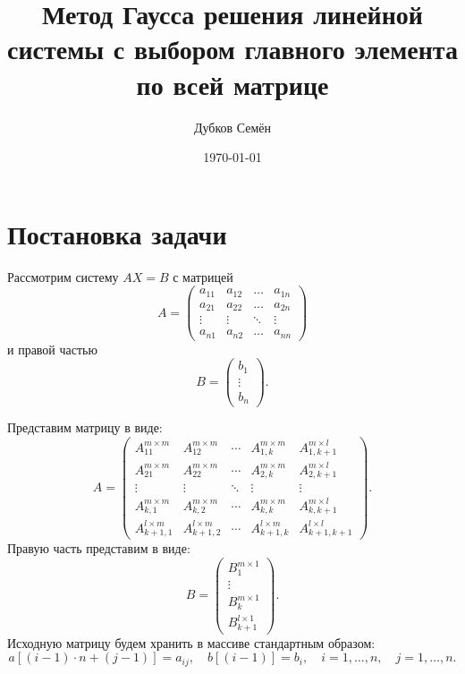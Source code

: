 \documentclass[a4paper,12pt]{article}
\begin{document}
\author{Дубков Семён}
\title{Метод Гаусса решения линейной системы с выбором главного элемента по всей матрице}
\date{\today}
\maketitle

\section{Постановка задачи}

Рассмотрим систему $AX=B$ с матрицей
$$A=
   \begin{pmatrix}
     a_{11}& a_{12} &\ldots & a_{1n}\\
     a_{21}& a_{22} &\ldots & a_{2n}\\
     \vdots& \vdots &\ddots & \vdots\\
     a_{n1}& a_{n2} &\ldots & a_{nn}
    \end{pmatrix}
$$
и правой частью
$$B=
   \begin{pmatrix}
    b_{1} \\
     \vdots \\
     b_{n}
    \end{pmatrix}.
$$

Представим матрицу в виде:
$$A=
  \begin{pmatrix} 
    A_{11}^{m \times m} & A_{12}^{m \times m} & \cdots & A_{1,k}^{m \times m} & A_{1,k+1}^{m \times l} \\
    A_{21}^{m \times m} & A_{22}^{m \times m} & \cdots & A_{2,k}^{m \times m} & A_{2,k+1}^{m \times l} \\ 
    \vdots & \vdots & \ddots & \vdots & \vdots \\ 
    A_{k,1}^{m \times m} & A_{k,2}^{m \times m} & \cdots & A_{k,k}^{m \times m} & A_{k,k+1}^{m \times l} \\
    A_{k+1,1}^{l \times m} & A_{k+1,2}^{l \times m} & \cdots & A_{k+1,k}^{l \times m} & A_{k+1,k+1}^{l \times l} 
  \end{pmatrix}.
$$
Правую часть представим в виде:
$$B=
   \begin{pmatrix}
    B_{1}^{m\times 1} \\
     \vdots \\
     B_{k}^{m\times 1}\\
     B_{k+1}^{l\times 1}
    \end{pmatrix}.
$$
Исходную матрицу будем хранить в массиве стандартным образом:
$$
a[(i-1) \cdot n + (j-1)] = a_{ij},\quad b[(i-1)]=b_i, \quad i=1,\dots,n,\quad j=1,\dots,n.
$$
\end{document}

